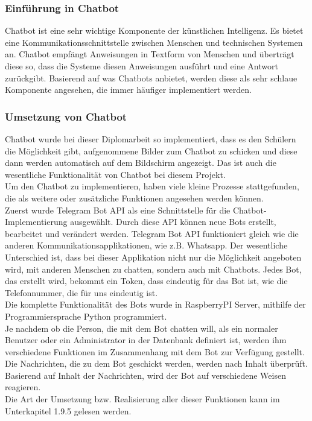 \subsubsection{Einführung in Chatbot}
Chatbot ist eine sehr wichtige Komponente der künstlichen Intelligenz. Es bietet eine Kommunikationsschnittstelle zwischen Menschen und technischen Systemen an. Chatbot empfängt Anweisungen in Textform von Menschen und überträgt diese so, dass die Systeme diesen Anweisungen ausführt und eine Antwort zurückgibt. Basierend auf was Chatbots anbietet, werden diese als sehr schlaue Komponente angesehen, die immer häufiger implementiert werden.
\subsubsection{Umsetzung von Chatbot}
Chatbot wurde bei dieser Diplomarbeit so implementiert, dass es den Schülern die Möglichkeit gibt, aufgenommene Bilder zum Chatbot zu schicken und diese dann werden automatisch auf dem Bildschirm angezeigt. Das ist auch die wesentliche Funktionalität von Chatbot bei diesem Projekt. \\
Um den Chatbot zu implementieren, haben viele kleine Prozesse stattgefunden, die als weitere oder zusätzliche Funktionen angesehen werden können.\\
Zuerst wurde Telegram Bot API als eine Schnittstelle für die Chatbot-Implementierung ausgewählt. Durch diese API können neue Bots erstellt, bearbeitet und verändert werden. Telegram Bot API funktioniert gleich wie die anderen Kommunikationsapplikationen, wie z.B. Whatsapp. Der wesentliche Unterschied ist, dass bei dieser Applikation nicht nur die Möglichkeit angeboten wird, mit anderen Menschen zu chatten, sondern auch mit Chatbots. Jedes Bot, das erstellt wird, bekommt ein Token, dass eindeutig für das Bot ist, wie die Telefonnummer, die für uns eindeutig ist. \\
Die komplette Funktionalität des Bots wurde in RaspberryPI Server, mithilfe der Programmiersprache Python programmiert. \\
Je nachdem ob die Person, die mit dem Bot chatten will, als ein normaler Benutzer oder ein Administrator in der Datenbank definiert ist, werden ihm verschiedene Funktionen im Zusammenhang mit dem Bot zur Verfügung gestellt. Die Nachrichten, die zu dem Bot geschickt werden, werden nach Inhalt überprüft. Basierend auf Inhalt der Nachrichten, wird der Bot auf verschiedene Weisen reagieren.\\
Die Art der Umsetzung bzw. Realisierung aller dieser Funktionen kann im Unterkapitel 1.9.5 gelesen werden.   

